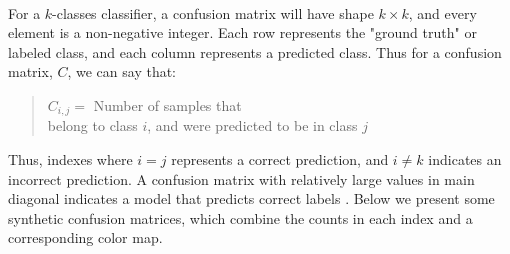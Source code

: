 \documentclass[12pt,letterpaper]{article}
\begin{document}
\paragraph*{}For a $k$-classes classifier, a confusion matrix will have shape $k \times k$, and every element is a non-negative integer. Each row represents the "ground truth" or  labeled class, and each column represents a predicted class. Thus for a confusion matrix, $C$, we can say that:
\begin{quote}
\label{eqn-ConfMat}
\begin{center}
$C_{i,j} =$ Number of samples that \\ 
belong to class $i$, and were predicted to be in class $j$
\end{center}

\end{quote}
Thus, indexes where $i = j$ represents a correct prediction, and $i \neq k$ indicates an incorrect prediction. A confusion matrix with relatively large values in main diagonal indicates a model that predicts correct labels \cite{Geron}.  Below we present some synthetic confusion matrices, which combine the counts in each index and a corresponding color map.
\end{document}

